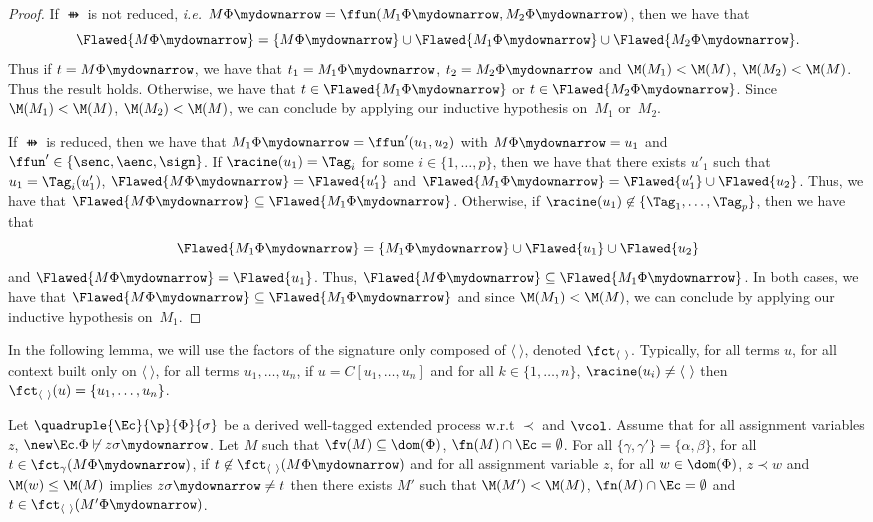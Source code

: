\begin{proof}
 If $\ffun$ is not reduced, \emph{i.e.} $M\Phi\mydownarrow =
 \ffun(M_1\Phi\mydownarrow, M_2\Phi\mydownarrow)$, then we have that
 \[
\Flawed{M\Phi\mydownarrow} = \{M\Phi\mydownarrow\} \cup
 \Flawed{M_1\Phi\mydownarrow} \cup \Flawed{M_2\Phi\mydownarrow}.
\] 
Thus if $t =
 M\Phi\mydownarrow$, we have that $t_1 = M_1\Phi\mydownarrow$, $t_2 =
 M_2\Phi\mydownarrow$ and $\M(M_1) < \M(M)$, $\M(M_2) < \M(M)$. Thus the result
 holds. Otherwise, we have that $t \in \Flawed{M_1\Phi\mydownarrow}$ or $t \in
 \Flawed{M_2\Phi\mydownarrow}$. Since $\M(M_1) < \M(M)$, $\M(M_2) < \M(M)$, we
 can conclude by applying our inductive hypothesis on~$M_1$ or~$M_2$.

 If $\ffun$ is reduced, then we have that $M_1\Phi\mydownarrow =
 \ffun'(u_1,u_2)$ with $M\Phi\mydownarrow = u_1$ and $\ffun' \in \{\senc,
 \aenc, \sign\}$. If $\racine(u_1) = \Tag_i$ for some $i \in \{1,\ldots,p\}$, then
 we have that there exists $u'_1$ such that $u_1 = \Tag_i(u'_1)$,
 $\Flawed{M\Phi\mydownarrow} = \Flawed{u'_1}$ and $\Flawed{M_1\Phi\mydownarrow}
 = \Flawed{u'_1} \cup \Flawed{u_2}$. Thus, we have that 
$\Flawed{M\Phi\mydownarrow} \subseteq
 \Flawed{M_1\Phi\mydownarrow}$.
Otherwise, if $\racine(u_1) \not\in \{\Tag_1,\ldots,\Tag_p\}$, then we
have that 
\[
\Flawed{M_1\Phi\mydownarrow} =
 \{M_1\Phi\mydownarrow\} \cup \Flawed{u_1} \cup \Flawed{u_2}
\]
 and
 $\Flawed{M\Phi\mydownarrow} = \Flawed{u_1}$. Thus, 
 $\Flawed{M\Phi\mydownarrow} \subseteq \Flawed{M_1\Phi\mydownarrow}$. In
 both cases, we have that $\Flawed{M\Phi\mydownarrow} \subseteq
 \Flawed{M_1\Phi\mydownarrow}$ and since $\M(M_1) < \M(M)$, we can conclude by
 applying our inductive hypothesis on~$M_1$.
\end{proof}


\newcommand{\fctpair}{\fct_{\langle\ \rangle}}

In the following lemma, we will use the factors of the signature only composed of $\langle\ \rangle$, denoted $\fctpair$. Typically, for all terms $u$, for all context built only on $\langle\ \rangle$, for all terms $u_1, \ldots, u_n$, if $u = C[u_1, \ldots, u_n]$ and for all $k \in \{1, \ldots, n\}$, $\racine(u_i) \neq \langle\ \rangle$ then $\fctpair(u) = \{ u_1, \ldots, u_n\}$.




\begin{lemma}
  \label{lem:FlawedColor and frame element direct element 2}
  Let $\quadruple{\Ec}{\p}{\Phi}{\sigma}$ be a derived well-tagged extended process w.r.t $\prec$ and $\vcol$. Assume that for all assignment variables $z$, $\new \Ec. \Phi \not\vdash z\sigma\mydownarrow$. Let $M$ such that $\fv(M) \subseteq \dom(\Phi)$, $\fn(M) \cap \Ec = \emptyset$. For all $\{\gamma,\gamma'\} = \{\alpha,\beta\}$, for all $t \in \fct_\gamma(M\Phi\mydownarrow)$, if $t \not\in \fctpair(M\Phi\mydownarrow)$ and for all assignment variable $z$, for all $w \in \dom(\Phi)$, $z \prec w$ and $\M(w) \leq \M(M)$ implies $z\sigma\mydownarrow \neq t$ then there exists $M'$ such that $\M(M') < \M(M)$, $\fn(M) \cap \Ec = \emptyset$ and $t \in \fctpair(M'\Phi\mydownarrow)$.
\end{lemma}

